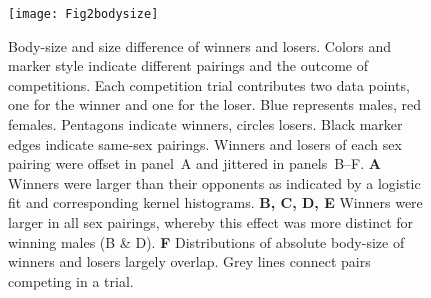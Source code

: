\documentclass[vruler,JEB]{COB}%
\newcommand{\figitem}[1]{\textsf{\bfseries\uppercase{#1}}\penalty10000 }
\newcommand{\panel}[1]{\textsf{#1}}
\begin{document}
\begin{figure}[!h]
\centerline{\texttt{[image: Fig2bodysize]}}
\caption{Body-size and size difference of winners and losers. Colors and marker style indicate different pairings and the outcome of competitions. Each competition trial contributes two data points, one for the winner and one for the loser. Blue represents males, red females. Pentagons indicate winners, circles losers. Black marker edges indicate same-sex pairings. Winners and losers of each sex pairing were offset in panel~\panel{A} and jittered in panels~\panel{B}--\panel{F}. \figitem{A} Winners were larger than their opponents as indicated by a logistic fit and corresponding kernel histograms. \figitem{B, C, D, E} Winners were larger in all sex pairings, whereby this effect was more distinct for winning males (\panel{B} \& \panel{D}). \figitem{F} Distributions of absolute body-size of winners and losers largely overlap. Grey lines connect pairs competing in a trial.}
\label{bodysize}
\end{figure}

\end{document}
